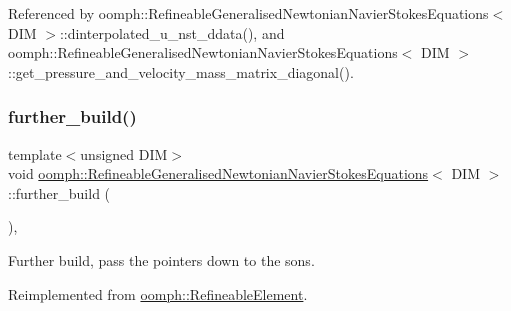 Referenced by oomph\+::\+Refineable\+Generalised\+Newtonian\+Navier\+Stokes\+Equations$<$ D\+I\+M $>$\+::dinterpolated\+\_\+u\+\_\+nst\+\_\+ddata(), and oomph\+::\+Refineable\+Generalised\+Newtonian\+Navier\+Stokes\+Equations$<$ D\+I\+M $>$\+::get\+\_\+pressure\+\_\+and\+\_\+velocity\+\_\+mass\+\_\+matrix\+\_\+diagonal().

\mbox{\label{classoomph_1_1RefineableGeneralisedNewtonianNavierStokesEquations_a53a4c5277d517f5df48df7c1953b2b02}} 
\subsubsection{\texorpdfstring{further\+\_\+build()}{further\_build()}}
{\footnotesize\ttfamily template$<$unsigned D\+IM$>$ \\
void \hyperlink{classoomph_1_1RefineableGeneralisedNewtonianNavierStokesEquations}{oomph\+::\+Refineable\+Generalised\+Newtonian\+Navier\+Stokes\+Equations}$<$ D\+IM $>$\+::further\+\_\+build (\begin{DoxyParamCaption}{ }\end{DoxyParamCaption})\hspace{0.3cm}{\ttfamily [inline]}, {\ttfamily [virtual]}}



Further build, pass the pointers down to the sons. 



Reimplemented from \hyperlink{classoomph_1_1RefineableElement_a26628ce36dfad028686adeb4694a9ef3}{oomph\+::\+Refineable\+Element}.



